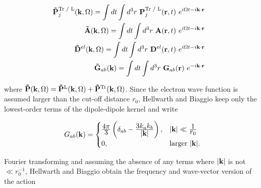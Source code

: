 \begin{align}
    \begin{split}
        \vb{\Tilde{P}}^{\text{Tr / L}}_j(\vb{k}, \Omega) &= \int dt \int d^3r\ \vb{P}_j^{\text{Tr / L}}(\vb{r}, t)\ e^{i\Omega t - i \vb{k} \cdot \vb{r}}
    \end{split}\\
    \begin{split}
        \vb{\Tilde{A}}(\vb{k}, \Omega) &= \int dt \int d^3r\ \vb{A}(\vb{r}, t)\ e^{i\Omega t - i \vb{k} \cdot \vb{r}}
    \end{split}\\
    \begin{split}\label{eqn:D_transform}
        \vb{\Tilde{D}}^{el}(\vb{k}, \Omega) &= \int dt \int d^3r\ \vb{D}^{el}(\vb{r}, t)\ e^{i\Omega t - i \vb{k} \cdot \vb{r}}
    \end{split}\\
    \begin{split}
        \vb{\Tilde{G}}_{ab}(\vb{k}) &= \int dt \int d^3r\ \vb{G}_{ab}(\vb{r})\ e^{- i \vb{k} \cdot \vb{r}}
    \end{split}
\end{align}

where $\vb{\Tilde{P}}(\vb{k}, \Omega) = \vb{\Tilde{P}}^{\text{L}}(\vb{k}, \Omega) + \vb{\Tilde{P}}^{\text{Tr}}(\vb{k}, \Omega)$. Since the electron wave function is assumed larger than the cut-off distance $r_0$, Hellwarth and Biaggio keep only the lowest-order terms of the dipole-dipole kernel and write

\begin{equation}
    G_{ab}(\vb{k}) =
    \begin{cases}
        \frac{\displaystyle 4\pi}{\displaystyle 3} \left( \delta_{ab} - \frac{\displaystyle 3k_a k_b}{\displaystyle \abs{\vb{k}}} \right), & \abs{\vb{k}} \ll \frac{\displaystyle 1}{\displaystyle r_0} \\
        0, & \text{larger } \abs{\vb{k}}.
    \end{cases}
\end{equation}

Fourier transforming and assuming the absence of any terms where $\abs{\vb{k}}$ is not $\ll r_0^{-1}$, Hellwarth and Biaggio obtain the frequency and wave-vector version of the action

